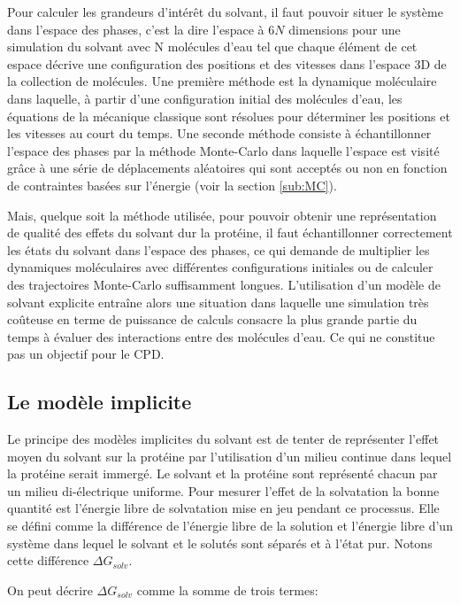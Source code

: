 Pour calculer les grandeurs d'intérêt du solvant, il faut pouvoir situer le système dans l'espace des phases, c'est la dire l'espace à $6N$ dimensions pour une simulation du solvant avec N molécules d'eau tel que chaque élément de cet espace décrive une configuration des positions et des vitesses dans l'espace 3D de la collection de molécules.
Une première méthode est la dynamique moléculaire dans laquelle, à partir d'une configuration initial des molécules d'eau, les équations de la mécanique classique sont résolues pour déterminer les positions et les vitesses au court du temps. Une seconde méthode consiste à échantillonner l'espace des phases par la méthode Monte-Carlo dans laquelle l'espace est visité grâce à une série de déplacements aléatoires qui sont acceptés ou non en fonction de contraintes basées sur l'énergie (voir la section \ref{sub:MC}).

Mais, quelque soit la méthode utilisée, pour pouvoir obtenir une représentation de qualité des effets du solvant dur la protéine, il faut échantillonner correctement les états du solvant dans l'espace des phases, ce qui demande de multiplier les dynamiques moléculaires avec différentes configurations initiales ou de calculer des trajectoires Monte-Carlo suffisamment longues.
L'utilisation d'un modèle de solvant explicite entraîne alors une situation dans laquelle une simulation très coûteuse en terme de puissance de calculs consacre la plus grande partie du temps à évaluer des interactions entre des molécules d'eau. Ce qui ne constitue pas un objectif pour le CPD.

\subsection{Le modèle implicite}

Le principe des modèles implicites du solvant est de tenter de représenter l'effet moyen du solvant sur la protéine par l'utilisation d'un milieu continue dans lequel la protéine serait immergé. Le solvant et la protéine sont représenté chacun par un milieu di-électrique uniforme.
Pour mesurer l'effet de la solvatation la bonne quantité est l'énergie libre de solvatation mise en jeu pendant ce processus. Elle se défini comme la différence de l'énergie libre de la solution et l'énergie libre d'un système dans lequel le solvant et le solutés sont séparés et à l'état pur. Notons cette différence $\Delta G_{solv}$.

On peut décrire $\Delta G_{solv}$ comme la somme de trois termes:

